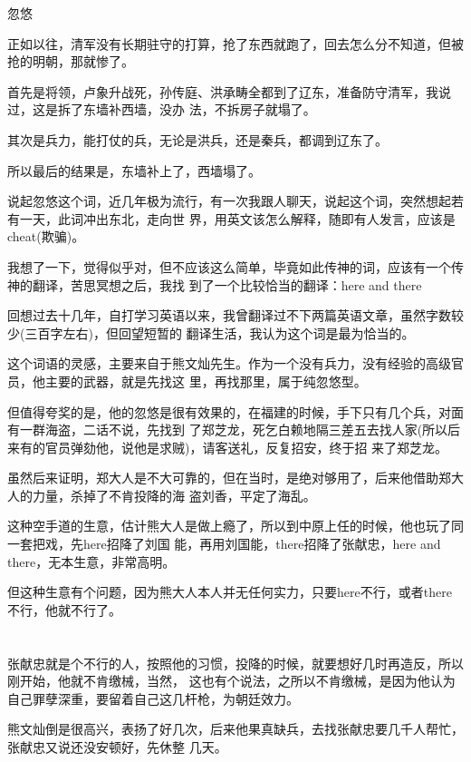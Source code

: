 \documentclass[11pt,a4paper,onecolumn]{article}
\begin{document}
忽悠

正如以往，清军没有长期驻守的打算，抢了东西就跑了，回去怎么分不知道，但被抢的明朝，那就惨了。

首先是将领，卢象升战死，孙传庭、洪承畴全都到了辽东，准备防守清军，我说过，这是拆了东墙补西墙，没办
法，不拆房子就塌了。

其次是兵力，能打仗的兵，无论是洪兵，还是秦兵，都调到辽东了。

所以最后的结果是，东墙补上了，西墙塌了。

说起忽悠这个词，近几年极为流行，有一次我跟人聊天，说起这个词，突然想起若有一天，此词冲出东北，走向世
界，用英文该怎么解释，随即有人发言，应该是cheat(欺骗)。

我想了一下，觉得似乎对，但不应该这么简单，毕竟如此传神的词，应该有一个传神的翻译，苦思冥想之后，我找
到了一个比较恰当的翻译：here and there

回想过去十几年，自打学习英语以来，我曾翻译过不下两篇英语文章，虽然字数较少(三百字左右)，但回望短暂的
翻译生活，我认为这个词是最为恰当的。

这个词语的灵感，主要来自于熊文灿先生。作为一个没有兵力，没有经验的高级官员，他主要的武器，就是先找这
里，再找那里，属于纯忽悠型。

但值得夸奖的是，他的忽悠是很有效果的，在福建的时候，手下只有几个兵，对面有一群海盗，二话不说，先找到
了郑芝龙，死乞白赖地隔三差五去找人家(所以后来有的官员弹劾他，说他是求贼)，请客送礼，反复招安，终于招
来了郑芝龙。

虽然后来证明，郑大人是不大可靠的，但在当时，是绝对够用了，后来他借助郑大人的力量，杀掉了不肯投降的海
盗刘香，平定了海乱。

这种空手道的生意，估计熊大人是做上瘾了，所以到中原上任的时候，他也玩了同一套把戏，先here招降了刘国
能，再用刘国能，there招降了张献忠，here and there，无本生意，非常高明。

但这种生意有个问题，因为熊大人本人并无任何实力，只要here不行，或者there不行，他就不行了。

\section[\thesection]{}

张献忠就是个不行的人，按照他的习惯，投降的时候，就要想好几时再造反，所以刚开始，他就不肯缴械，当然，
这也有个说法，之所以不肯缴械，是因为他认为自己罪孽深重，要留着自己这几杆枪，为朝廷效力。

熊文灿倒是很高兴，表扬了好几次，后来他果真缺兵，去找张献忠要几千人帮忙，张献忠又说还没安顿好，先休整
几天。
\end{document}
